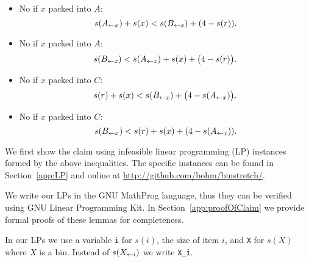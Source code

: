 \begin{itemize}
\item No  if $x$ packed into $A$:
\begin{equation}\label{eq:8}
s(A_{\leftarrow x}) + s(x) < s(B_{\leftarrow x}) + (4 - s(r)).
\end{equation}

\item No  if $x$ packed into $A$:
\begin{equation}\label{eq:8b}
s(B_{\leftarrow x}) < s(A_{\leftarrow x}) + s(x) + \big(4 - s(r)\big).
\end{equation}

\item No  if $x$ packed into $C$:
\begin{equation}\label{eq:9b}
s(r) + s(x) < s(B_{\leftarrow x}) + \big(4 - s(A_{\leftarrow x})\big).
\end{equation}

\item No  if $x$ packed into $C$:
\begin{equation}\label{eq:9}
s(B_{\leftarrow x}) < s(r) + s(x) + (4 - s(A_{\leftarrow x})). 
\end{equation}
\end{itemize}

\setlength{\abovedisplayskip}{\ads}
\setlength{\belowdisplayskip}{\bds}
\goodbreak

We first show the claim using infeasible linear programming (LP)
instances formed by the above inequalities.  The specific instances
can be found in Section~\ref{app:LP} and online at \url{http://github.com/bohm/binstretch/}.

We write our LPs in the GNU MathProg language, thus they can be
verified using GNU Linear Programming Kit. In
Section~\ref{app:proofOfClaim} we provide formal proofs of these
lemmas for completeness.

In our LPs we use a variable \texttt{i} for $s(i)$, the size of item $i$,
and \texttt{X} for $s(X)$ where $X$ is a bin. Instead of $s(X_{\leftarrow i})$
we write \texttt{X\_i}.

